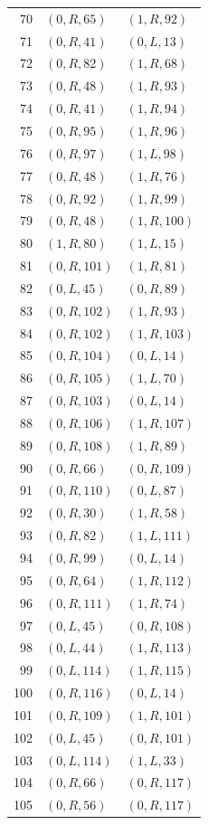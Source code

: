 \begin{longtable}{rll}
70 & $(0,R,65)$ & $(1,R,92)$ \\
71 & $(0,R,41)$ & $(0,L,13)$ \\
72 & $(0,R,82)$ & $(1,R,68)$ \\
73 & $(0,R,48)$ & $(1,R,93)$ \\
74 & $(0,R,41)$ & $(1,R,94)$ \\
75 & $(0,R,95)$ & $(1,R,96)$ \\
76 & $(0,R,97)$ & $(1,L,98)$ \\
77 & $(0,R,48)$ & $(1,R,76)$ \\
78 & $(0,R,92)$ & $(1,R,99)$ \\
79 & $(0,R,48)$ & $(1,R,100)$ \\
80 & $(1,R,80)$ & $(1,L,15)$ \\
81 & $(0,R,101)$ & $(1,R,81)$ \\
82 & $(0,L,45)$ & $(0,R,89)$ \\
83 & $(0,R,102)$ & $(1,R,93)$ \\
84 & $(0,R,102)$ & $(1,R,103)$ \\
85 & $(0,R,104)$ & $(0,L,14)$ \\
86 & $(0,R,105)$ & $(1,L,70)$ \\
87 & $(0,R,103)$ & $(0,L,14)$ \\
88 & $(0,R,106)$ & $(1,R,107)$ \\
89 & $(0,R,108)$ & $(1,R,89)$ \\
90 & $(0,R,66)$ & $(0,R,109)$ \\
91 & $(0,R,110)$ & $(0,L,87)$ \\
92 & $(0,R,30)$ & $(1,R,58)$ \\
93 & $(0,R,82)$ & $(1,L,111)$ \\
94 & $(0,R,99)$ & $(0,L,14)$ \\
95 & $(0,R,64)$ & $(1,R,112)$ \\
96 & $(0,R,111)$ & $(1,R,74)$ \\
97 & $(0,L,45)$ & $(0,R,108)$ \\
98 & $(0,L,44)$ & $(1,R,113)$ \\
99 & $(0,L,114)$ & $(1,R,115)$ \\
100 & $(0,R,116)$ & $(0,L,14)$ \\
101 & $(0,R,109)$ & $(1,R,101)$ \\
102 & $(0,L,45)$ & $(0,R,101)$ \\
103 & $(0,L,114)$ & $(1,L,33)$ \\
104 & $(0,R,66)$ & $(0,R,117)$ \\
105 & $(0,R,56)$ & $(0,R,117)$ \\

\end{longtable}
